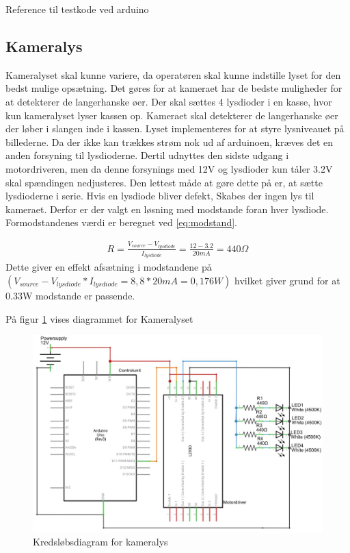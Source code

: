 Reference til testkode ved arduino 
 
 \subsection{Kameralys}
 \label{subsec:kameralys}
 Kameralyset skal kunne variere, da operatøren skal kunne indstille lyset for den bedst mulige opsætning. Det gøres for at kameraet har de bedste muligheder for at detekterer de langerhanske øer. Der skal sættes 4 lysdioder i en kasse, hvor kun kameralyset lyser kassen op. Kameraet skal detekterer de langerhanske øer der løber i slangen inde i kassen. Lyset implementeres for at styre lysniveauet på billederne. Da der ikke kan trækkes strøm nok ud af arduinoen, kræves det en anden forsyning til lysdioderne. Dertil udnyttes den sidste udgang i motordriveren, men da denne forsynings med 12V og lysdioder kun tåler 3.2V skal spændingen nedjusteres. Den lettest måde at gøre dette på er, at sætte lysdioderne i serie. Hvis en lysdiode bliver defekt, Skabes der ingen lys til kameraet. Derfor er der valgt en løsning med modstande foran hver lysdiode. Formodstandenes værdi er beregnet ved \ref{eq:modstand}. 

\begin{align}
R=\frac{V_{source}-V_{lysdiode}}{I_{lysdiode}}=\frac{12-3.2}{20mA}=440\Omega
\label{eq:modstand}
\end{align} 
Dette giver en effekt afsætning i modstandene på $(V_{source}-V_{lysdiode}*I_{lysdiode}=8,8*20mA=0,176W)$ hvilket giver grund for at 0.33W modstande er passende.

På figur \ref{fig:LEDdiagram} vises diagrammet for Kameralyset
 
 \begin{figure}[H]
	\centering
	\includegraphics[width=1\textwidth]{billeder/Hardware/diagrammer/LEDdiagram.JPG}
	\caption{Kredsløbsdiagram for kameralys}
	\label{fig:LEDdiagram}
\end{figure} 

